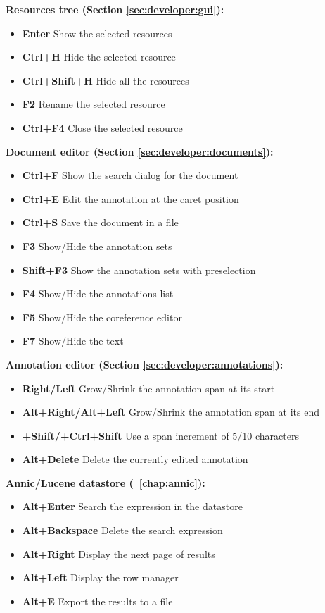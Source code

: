 {\bf Resources tree (Section \ref{sec:developer:gui}):}

\begin{itemize}
\item {\bf Enter} Show the selected resources
\item {\bf Ctrl+H} Hide the selected resource
\item {\bf Ctrl+Shift+H} Hide all the resources
\item {\bf F2} Rename the selected resource
\item {\bf Ctrl+F4} Close the selected resource
\end{itemize}

{\bf Document editor (Section \ref{sec:developer:documents}):}

\begin{itemize}
\item {\bf Ctrl+F} Show the search dialog for the document
\item {\bf Ctrl+E} Edit the annotation at the caret position
\item {\bf Ctrl+S} Save the document in a file
\item {\bf F3} Show/Hide the annotation sets
\item {\bf Shift+F3} Show the annotation sets with preselection
\item {\bf F4} Show/Hide the annotations list
\item {\bf F5} Show/Hide the coreference editor
\item {\bf F7} Show/Hide the text
\end{itemize}

{\bf Annotation editor (Section \ref{sec:developer:annotations}):}

\begin{itemize}
\item {\bf Right/Left} Grow/Shrink the annotation span at its start
\item {\bf Alt+Right/Alt+Left} Grow/Shrink the annotation span at its end
\item {\bf +Shift/+Ctrl+Shift} Use a span increment of 5/10 characters
\item {\bf Alt+Delete} Delete the currently edited annotation
\end{itemize}

{\bf Annic/Lucene datastore (\Chapthing~\ref{chap:annic}):}

\begin{itemize}
\item {\bf Alt+Enter} Search the expression in the datastore
\item {\bf Alt+Backspace} Delete the search expression
\item {\bf Alt+Right} Display the next page of results
\item {\bf Alt+Left} Display the row manager
\item {\bf Alt+E} Export the results to a file
\end{itemize}

